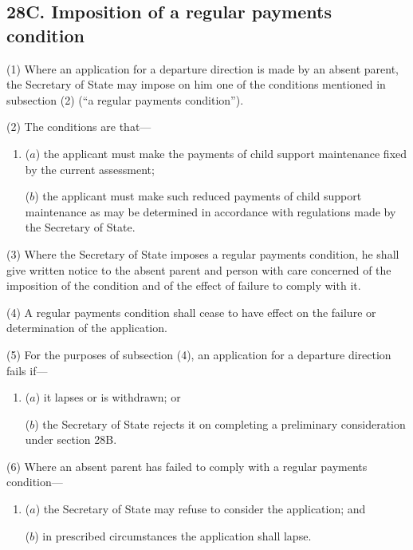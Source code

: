 \documentclass[12pt,a4paper]{article}
\begin{document}

\subsection{28C. Imposition of a regular payments condition}

(1) Where an application for a departure direction is made by an absent parent, the Secretary of State may impose on him one of the conditions mentioned in subsection (2) (“a regular payments condition”).

(2) The conditions are that—
\begin{enumerate}\item[]
($a$) the applicant must make the payments of child support maintenance fixed by the current assessment;

($b$) the applicant must make such reduced payments of child support maintenance as may be determined in accordance with regulations made by the Secretary of State.
\end{enumerate}

(3) Where the Secretary of State imposes a regular payments condition, he shall give written notice to the absent parent and person with care concerned of the imposition of the condition and of the effect of failure to comply with it.

(4) A regular payments condition shall cease to have effect on the failure or determination of the application.

(5) For the purposes of subsection (4), an application for a departure direction fails if—
\begin{enumerate}\item[]
($a$) it lapses or is withdrawn; or

($b$) the Secretary of State rejects it on completing a preliminary consideration under section 28B.
\end{enumerate}

(6) Where an absent parent has failed to comply with a regular payments condition—
\begin{enumerate}\item[]
($a$) the Secretary of State may refuse to consider the application; and

($b$) in prescribed circumstances the application shall lapse.
\end{enumerate}
\end{document}
